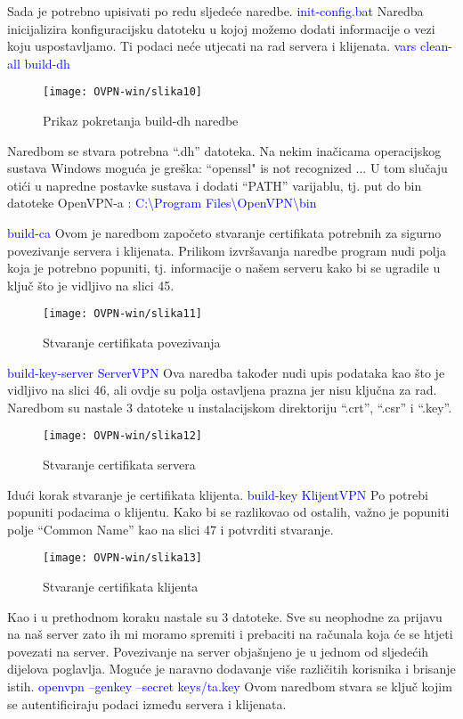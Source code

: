 Sada je potrebno upisivati po redu sljedeće naredbe.
\smallbreak
\small\textcolor{blue}{init-config.bat}
\smallbreak
Naredba inicijalizira konfiguracijsku datoteku u kojoj možemo dodati informacije o vezi koju uspostavljamo. Ti podaci neće utjecati na rad servera i klijenata.
\smallbreak
\small\textcolor{blue}{vars}
\smallbreak
\smallbreak
\small\textcolor{blue}{clean-all}
\smallbreak
\smallbreak
\small\textcolor{blue}{build-dh}
\smallbreak
\begin{figure}[h!]
	\centering
     \texttt{[image: OVPN-win/slika10]}
     \caption{Prikaz pokretanja build-dh naredbe}
\end{figure}
\FloatBarrier
Naredbom se stvara potrebna ``.dh'' datoteka. Na nekim inačicama operacijskog sustava Windows moguća je greška: ``openssl" is not recognized ...\smallbreak
U tom slučaju otići u napredne postavke sustava i dodati ``PATH'' varijablu, tj. put do bin datoteke OpenVPN-a :
\small\textcolor{blue}{C:\textbackslash Program Files\textbackslash OpenVPN\textbackslash bin}
	
\smallbreak
\small\textcolor{blue}{build-ca}
\smallbreak
Ovom je naredbom započeto stvaranje certifikata potrebnih za sigurno povezivanje servera i klijenata. Prilikom izvršavanja naredbe program nudi polja koja je potrebno popuniti, tj. informacije o našem serveru kako bi se ugradile u ključ što je vidljivo na slici 45.
\begin{figure}[h!]
	\centering
     \texttt{[image: OVPN-win/slika11]}
     \caption{Stvaranje certifikata povezivanja}
\end{figure}
\FloatBarrier
\smallbreak
\small\textcolor{blue}{build-key-server ServerVPN}
\smallbreak
Ova naredba također nudi upis podataka kao što je vidljivo na slici 46, ali ovdje su polja ostavljena prazna jer nisu ključna za rad. Naredbom su nastale 3 datoteke u instalacijskom direktoriju ``.crt'',  ``.csr'' i ``.key''.
\begin{figure}[h!]
	\centering
     \texttt{[image: OVPN-win/slika12]}
     \caption{Stvaranje certifikata servera}
\end{figure}
\FloatBarrier
Idući korak stvaranje je certifikata klijenta.
\smallbreak
\small\textcolor{blue}{build-key KlijentVPN}
\smallbreak
Po potrebi popuniti podacima o klijentu. Kako bi se razlikovao od ostalih, važno je popuniti polje ``Common Name'' kao na slici 47 i potvrditi stvaranje.
\begin{figure}[h!]
	\centering
     \texttt{[image: OVPN-win/slika13]}
     \caption{Stvaranje certifikata klijenta}
\end{figure}
\FloatBarrier
Kao i u prethodnom koraku nastale su 3 datoteke. Sve su neophodne za prijavu na naš server zato ih mi moramo spremiti i prebaciti na računala koja će se htjeti povezati na server. Povezivanje na server objašnjeno je u jednom od sljedećih dijelova poglavlja.\smallbreak
Moguće je naravno dodavanje više različitih korisnika i brisanje istih.
\smallbreak
\small\textcolor{blue}{openvpn --genkey --secret keys/ta.key}
\smallbreak
Ovom naredbom stvara se ključ kojim se autentificiraju podaci između servera i klijenata.
 
